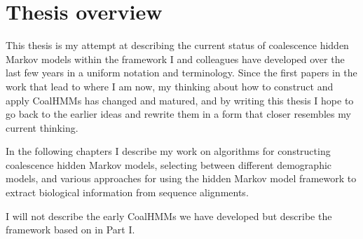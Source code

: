 \section{Thesis overview}

This thesis is my attempt at describing the current status of coalescence hidden Markov models within the framework I and colleagues have developed over the last few years in a uniform notation and terminology. Since the first papers in the work that lead to where I am now, my thinking about how to construct and apply CoalHMMs has changed and matured, and by writing this thesis I hope to go back to the earlier ideas and rewrite them in a form that closer resembles my current thinking.

In the following chapters I describe my work on algorithms for constructing coalescence hidden Markov models, selecting between different demographic models, and various approaches for using the hidden Markov model framework to extract biological information from sequence alignments.

I will not describe the early CoalHMMs we have developed but describe the framework based on \citet{Mailund:2011dv,Mailund:2012ew,springerlink:10.1007/978-3-642-31131-4_3} in Part I.

